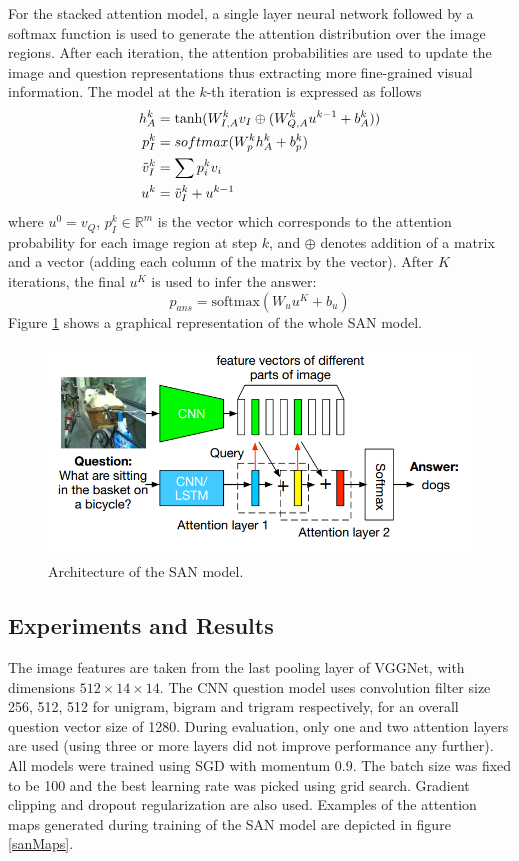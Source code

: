 \documentclass{article}
\begin{document}
For the stacked attention model, a single layer neural network followed by a softmax function is used to generate the attention distribution over the image regions. After each iteration, the attention probabilities are used to update the image and question representations thus extracting more fine-grained visual information. The model at the $k$-th iteration is expressed as follows
\begin{align*}
    h_A^k &= \text{tanh}(W_{I,A}^kv_I \oplus (W_{Q,A}^ku^{k-1} + b_A^k))\\
    p_I^k &= softmax(W_p^kh_A^k + b_p^k)\\
    \Tilde{v}_I^k &= \sum p_i^kv_i\\
    u^k &= \Tilde{v}_I^k + u^{k-1}
\end{align*}
where $u^0 = v_Q$, $p_I^k \in \mathbb{R}^m$ is the vector which corresponds to the attention probability for each image region at step $k$, and $\oplus$ denotes addition of a matrix and a vector (adding each column of the matrix by the vector). After $K$ iterations, the final $u^K$ is used to infer the answer:
\begin{equation*}
    p_{ans} = \text{softmax}(W_uu^K + b_u)
\end{equation*}
Figure \ref{sanArch} shows a graphical representation of the whole SAN model.

    \begin{figure}[ht]
    	\centering
            \includegraphics[width=0.75\linewidth]{sanArch.PNG}
    	\caption{Architecture of the SAN model.}
    	\label{sanArch}
    \end{figure}

\subsection{Experiments and Results}
The image features are taken from the last pooling layer of VGGNet, with dimensions $512 \times 14 \times 14$. The CNN question model uses convolution filter size 256, 512, 512 for unigram, bigram and trigram respectively, for an overall question vector size of 1280. During evaluation, only one and two attention layers are used (using three or more layers did not improve performance any further). All models were trained using SGD with momentum 0.9. The batch size was fixed to be 100 and the best learning rate was picked using grid search. Gradient clipping and dropout regularization are also used. Examples of the attention maps generated during training of the SAN model are depicted in figure \ref{sanMaps}.
\end{document}
